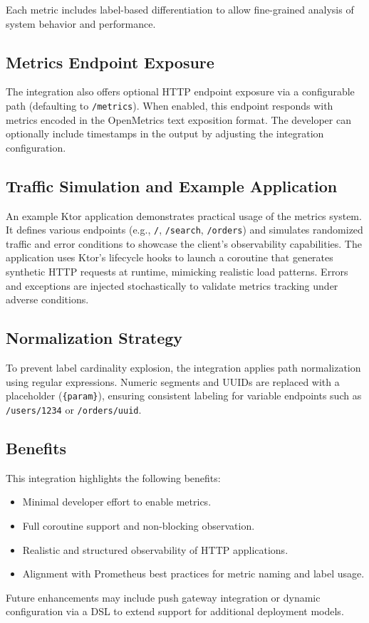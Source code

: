 Each metric includes label-based differentiation to allow fine-grained analysis of system behavior and performance.

\subsection*{Metrics Endpoint Exposure}
The integration also offers optional HTTP endpoint exposure via a configurable path (defaulting to \texttt{/metrics}). When enabled, this endpoint responds with metrics encoded in the OpenMetrics text exposition format. The developer can optionally include timestamps in the output by adjusting the integration configuration.

\subsection*{Traffic Simulation and Example Application}
An example Ktor application demonstrates practical usage of the metrics system. It defines various endpoints (e.g., \texttt{/}, \texttt{/search}, \texttt{/orders}) and simulates randomized traffic and error conditions to showcase the client's observability capabilities. The application uses Ktor's lifecycle hooks to launch a coroutine that generates synthetic HTTP requests at runtime, mimicking realistic load patterns. Errors and exceptions are injected stochastically to validate metrics tracking under adverse conditions.

\subsection*{Normalization Strategy}
To prevent label cardinality explosion, the integration applies path normalization using regular expressions. Numeric segments and UUIDs are replaced with a placeholder (\texttt{\{param\}}), ensuring consistent labeling for variable endpoints such as \texttt{/users/1234} or \texttt{/orders/uuid}.

\subsection*{Benefits}
This integration highlights the following benefits:
\begin{itemize}
  \item Minimal developer effort to enable metrics.
  \item Full coroutine support and non-blocking observation.
  \item Realistic and structured observability of HTTP applications.
  \item Alignment with Prometheus best practices for metric naming and label usage.
\end{itemize}

Future enhancements may include push gateway integration or dynamic configuration via a DSL to extend support for additional deployment models.

